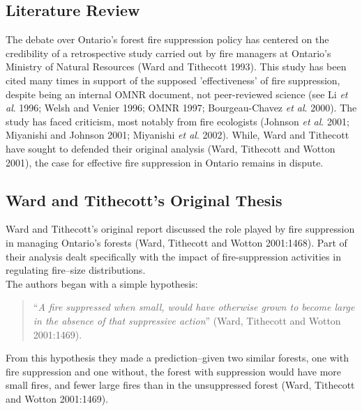 \begin{spacing}{1.5}
\phantom
\phantom
\phantom
\phantom
\section{Literature Review}
\phantom
\phantom
The debate over Ontario's forest fire suppression policy has centered on the credibility of a retrospective study carried out by fire managers at Ontario's Ministry of Natural Resources (Ward and Tithecott 1993). This study has been cited many times in support of the supposed 'effectiveness' of fire suppression, despite being an internal OMNR document, not peer-reviewed science (see Li \emph{et al}. 1996; Welsh and Venier 1996; OMNR 1997; Bourgeau-Chavez \emph{et al}. 2000). The study has faced criticism, most notably from fire ecologists (Johnson \emph{et al}. 2001; Miyanishi and Johnson 2001; Miyanishi \emph{et al}. 2002). While, Ward and Tithecott have sought to defended their original analysis (Ward, Tithecott and Wotton 2001), the case for effective fire suppression in Ontario remains in dispute.

\subsection{Ward and Tithecott's Original Thesis}
Ward and Tithecott's original report discussed the role played by fire suppression in managing Ontario's forests (Ward, Tithecott and Wotton 2001:1468). Part of their analysis dealt specifically with the impact of fire-suppression activities in regulating fire--size distributions. \\

\noindent The authors began with a simple hypothesis:

\begin{quote}
``{\it A fire suppressed when small, would have otherwise grown to become large in the absence of that suppressive action}'' (Ward, Tithecott and Wotton 2001:1469).
\end{quote}

\noindent From this hypothesis they made a prediction--given two similar forests, one with fire suppression and one without, the forest with suppression would have more small fires, and fewer large fires than in the unsuppressed forest (Ward, Tithecott and Wotton 2001:1469).

\clearpage


\end{spacing}
